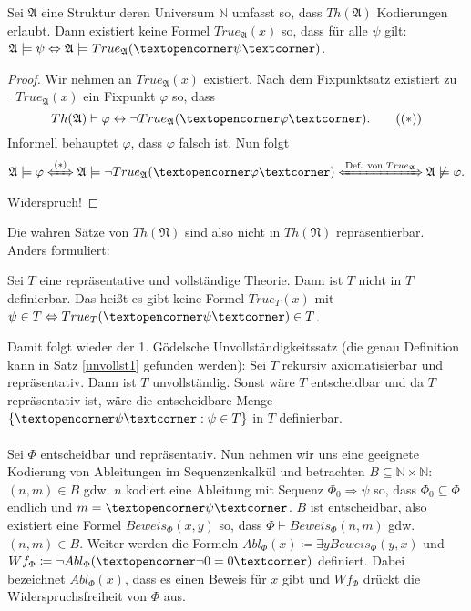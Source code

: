 \begin{satz}
	Sei $\mathfrak{A}$ eine Struktur deren Universum $\mathbb{N}$ umfasst so, dass $Th(\mathfrak{A})$ Kodierungen erlaubt. Dann existiert keine Formel $True_\mathfrak{A}(x)$ so, dass für alle $\psi$ gilt: $\mathfrak{A}\models\psi\Leftrightarrow\mathfrak{A}\models True_\mathfrak{A}(\opencorner\psi\closecorner)$.
\end{satz}
\begin{proof}
	Wir nehmen an $True_\mathfrak{A}(x)$ existiert.
	Nach dem Fixpunktsatz existiert zu $\neg True_\mathfrak{A}(x)$ ein Fixpunkt $\varphi$ so, dass
	\[Th(\mathfrak{A})\vdash\varphi\leftrightarrow\neg True_\mathfrak{A}(\opencorner\varphi\closecorner). \tag{$(\ast)$}\]
	Informell \glqq behauptet \grqq{} $\varphi$, dass $\varphi$ falsch ist. Nun folgt
	\[\mathfrak{A}\models\varphi \xLeftrightarrow{(\ast)} \mathfrak{A}\models\neg True_\mathfrak{A}(\opencorner\varphi\closecorner) \xLeftrightarrow{\text{Def. von } True_\mathfrak{A}}\mathfrak{A}\not\models\varphi.\] Widerspruch!
\end{proof}

Die wahren Sätze von $Th(\mathfrak{N})$ sind also nicht in $Th(\mathfrak{N})$ repräsentierbar. Anders formuliert:

Sei $T$ eine repräsentative und vollständige Theorie. Dann ist $T$ nicht in $T$ definierbar. Das heißt es gibt keine Formel $True_T(x)$ mit $\psi\in T\Leftrightarrow True_T(\opencorner\psi\closecorner)\in T$.

Damit folgt wieder der 1. Gödelsche Unvollständigkeitssatz (die genau Definition kann in Satz \ref{unvollst1} gefunden werden): Sei $T$ rekursiv axiomatisierbar und repräsentativ. Dann ist $T$ unvollständig. Sonst wäre $T$ entscheidbar und da $T$ repräsentativ ist, wäre die entscheidbare Menge $\{\opencorner\psi\closecorner:\psi\in T\}$ in $T$ definierbar.
\\
\\
Sei $\Phi$ entscheidbar und repräsentativ. Nun nehmen wir uns eine geeignete Kodierung von Ableitungen im Sequenzenkalkül und betrachten $B\subseteq\mathbb{N}\times\mathbb{N}$: $(n,m)\in B$ gdw. $n$ kodiert eine Ableitung mit Sequenz $\Phi_0\Rightarrow\psi$ so, dass $\Phi_0\subseteq \Phi$ endlich und $m=\opencorner\psi\closecorner$. $B$ ist entscheidbar, also existiert eine Formel $Beweis_\Phi(x,y)$ so, dass $\Phi\vdash Beweis_\Phi(n,m)$ gdw. $(n,m)\in B$. Weiter werden die Formeln $Abl_\Phi(x)\coloneqq\exists y Beweis_\Phi(y,x)$ und $Wf_\Phi\coloneqq \neg Abl_\Phi(\opencorner\neg0=0\closecorner)$ definiert. Dabei bezeichnet $Abl_\Phi(x)$, dass es einen Beweis für $x$ gibt und $Wf_\Phi$ drückt die Widerspruchsfreiheit von $\Phi$ aus.

